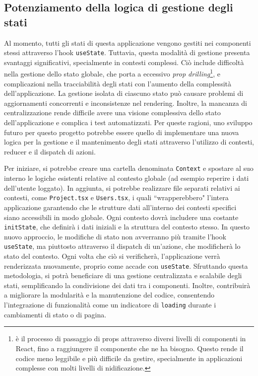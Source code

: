 \documentclass[target=bach,aauheader=,style=]{thud}
\begin{document}
\subsection{Potenziamento della logica di gestione degli stati}
Al momento, tutti gli stati di questa applicazione vengono gestiti nei componenti stessi attraverso l'hook \texttt{useState}. Tuttavia, questa modalità di gestione presenta svantaggi significativi, specialmente in contesti complessi. Ciò include difficoltà nella gestione dello stato globale, che porta a eccessivo \textit{prop drilling}\footnote{è il processo di passaggio di props attraverso diversi livelli di componenti in React, fino a raggiungere il componente che ne ha bisogno. Questo rende il codice meno leggibile e più difficile da gestire, specialmente in applicazioni complesse con molti livelli di nidificazione.}, e complicazioni nella tracciabilità degli stati con l'aumento della complessità dell'applicazione. La gestione isolata di ciascuno stato può causare problemi di aggiornamenti concorrenti e inconsistenze nel rendering. Inoltre, la mancanza di centralizzazione rende difficile avere una visione complessiva dello stato dell'applicazione e complica i test automatizzati. Per queste ragioni, uno sviluppo futuro per questo progetto potrebbe essere quello di implementare una nuova logica per la gestione e il mantenimento degli stati attraverso l'utilizzo di contesti, reducer e il dispatch di azioni. 

\noindent Per iniziare, si potrebbe creare una cartella denominata \texttt{Context} e spostare al suo interno le logiche esistenti relative al contesto globale (ad esempio reperire i dati dell'utente loggato). In aggiunta, si potrebbe realizzare file separati relativi ai contesti, come \texttt{Project.tsx} e \texttt{Users.tsx}, i quali ``wrapperebbero" l'intera applicazione garantendo che le strutture dati all'interno dei contesti specifici siano accessibili in modo globale. Ogni contesto dovrà includere una costante \texttt{initState}, che definirà i dati iniziali e la struttura del contesto stesso. In questo nuovo approccio, le modifiche di stato non avverranno più tramite l'hook \texttt{useState}, ma piuttosto attraverso il dispatch di un'azione, che modificherà lo stato del contesto. Ogni volta che ciò si verificherà, l'applicazione verrà renderizzata nuovamente, proprio come accade con \texttt{useState}. Sfruttando questa metodologia, si potrà beneficiare di una gestione centralizzata e scalabile degli stati, semplificando la condivisione dei dati tra i componenti. Inoltre, contribuirà a migliorare la modularità e la manutenzione del codice, consentendo l'integrazione di funzionalità come un indicatore di \texttt{loading} durante i cambiamenti di stato o di pagina.
\end{document}
